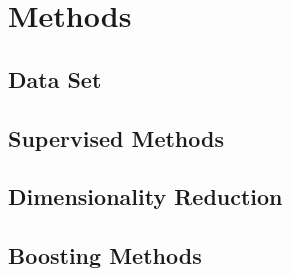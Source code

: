 \section{Methods}
\subsection{Data Set}

\subsection{Supervised Methods}

\subsection{Dimensionality Reduction}

\subsection{Boosting Methods}